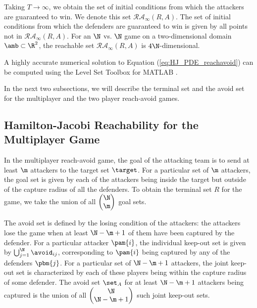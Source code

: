 Taking $T\rightarrow\infty$, we obtain the set of initial conditions from which the attackers are guaranteed to win. We denote this set $\mathcal{RA}_\infty(R,A)$. The set of initial conditions from which the defenders are guaranteed to win is given by all points not in $\mathcal{RA}_\infty(R,A)$. For an $\N$ vs. $\N$ game on a two-dimensional domain $\amb\subset\R^2$, the reachable set $\mathcal{RA}_\infty(R,A)$ is $4\N$-dimensional.

A highly accurate numerical solution to Equation (\ref{eq:HJ_PDE_reachavoid}) can be computed using the Level Set Toolbox for MATLAB \cite{LSToolbox}.

In the next two subsections, we will describe the terminal set and the avoid set for the multiplayer and the two player reach-avoid games.

\subsection{Hamilton-Jacobi Reachability for the Multiplayer Game}
\label{subsec:hj_multi}
In the multiplayer reach-avoid game, the goal of the attacking team is to send at least $\m$ attackers to the target set $\target$. For a particular set of $\m$ attackers, the goal set is given by each of the attackers being inside the target but outside of the capture radius of all the defenders. To obtain the terminal set $R$ for the game, we take the union of all $\begin{pmatrix} \N \\ \m \end{pmatrix}$ goal sets.

The avoid set is defined by the losing condition of the attackers: the attackers lose the game when at least $\N-\m+1$ of them have been captured by the defender. For a particular attacker $\pam{i}$, the individual keep-out set is given by $\bigcup_{j=1}^\N \avoid_{ij}$, corresponding to $\pam{i}$ being captured by any of the defenders $\pbm{j}$. For a particular set of $\N-\m+1$ attackers, the joint keep-out set is characterized by each of these players being within the capture radius of some defender. The avoid set $\set_A$ for at least $\N-\m+1$ attackers being captured is the union of all $\begin{pmatrix} \N \\ \N-\m+1 \end{pmatrix}$ such joint keep-out sets. %

